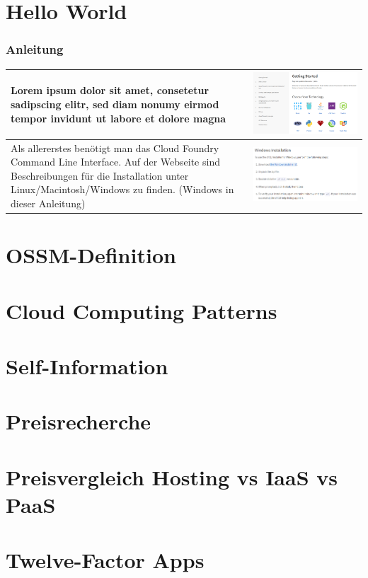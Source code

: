 \chapter{Hello World}
\subsection{Anleitung}
\begin{table}[H]
\begin{tabular}{| p{5cm} | p{11cm} |}
\hline
Lorem ipsum dolor sit amet, consetetur sadipscing elitr, sed diam nonumy eirmod tempor invidunt ut labore et dolore magna 
&\includegraphics[width=0.65\columnwidth, valign=T]{images/image1.png}\\ \hline
Als allererstes benötigt man das Cloud Foundry Command Line Interface. Auf der Webseite sind Beschreibungen für die Installation unter Linux/Macintosh/Windows zu finden. (Windows in dieser Anleitung)&\includegraphics[width=0.65\columnwidth, valign=T]{images/image2.png} \\ \hline
\end{tabular}
\end{table}
\chapter{OSSM-Definition}
\chapter{Cloud Computing Patterns}
\chapter{Self-Information}
\chapter{Preisrecherche}
\chapter{Preisvergleich Hosting vs IaaS vs PaaS}
\chapter{Twelve-Factor Apps}

